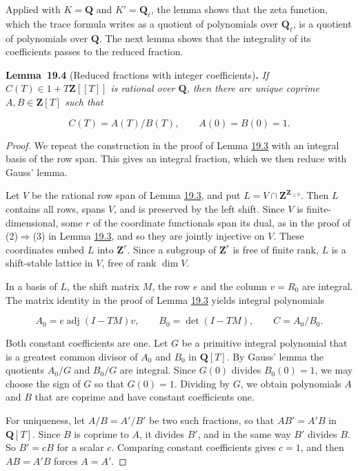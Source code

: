 \documentclass[11pt]{article}
\newenvironment{bpstatement}[2]{\par\addvspace{0.6\baselineskip}\noindent\textbf{#1}#2\textbf{.}\enspace\ignorespaces}
  {\par\addvspace{0.4\baselineskip}}
\newenvironment{bpstatementit}[2]{\begin{bpstatement}{#1}{#2}\itshape\ignorespaces}{\end{bpstatement}}
\begin{document}
\label{bp332}%
Applied with \(K=\mathbf Q\) and \(K'=\mathbf Q_\ell\), the lemma shows that the zeta function, which the trace formula writes as a quotient of polynomials over \(\mathbf Q_\ell\), is a quotient of polynomials over \(\mathbf Q\). The next lemma shows that the integrality of its coefficients passes to the reduced fraction.

\label{bp333}%
\begin{bpstatementit}{Lemma~19.4}{ (Reduced fractions with integer coefficients)}
If \(C(T)\in1+T\mathbf Z[[T]]\) is rational over \(\mathbf Q\), then there are unique coprime \(A,B\in\mathbf Z[T]\) such that

\[
C(T)=A(T)/B(T),\qquad A(0)=B(0)=1.
\]
\end{bpstatementit}

\begin{proof}[{Proof}]\label{bp334}%
We repeat the construction in the proof of Lemma \hyperref[bp330]{19.3} with an integral basis of the row span. This gives an integral fraction, which we then reduce with Gauss' lemma.

Let \(V\) be the rational row span of Lemma \hyperref[bp330]{19.3}, and put \(L=V\cap\mathbf Z^{\mathbf Z_{\geq0}}\). Then \(L\) contains all rows, spans \(V\), and is preserved by the left shift. Since \(V\) is finite-dimensional, some \(r\) of the coordinate functionals span its dual, as in the proof of (2)\(\Rightarrow\)(3) in Lemma \hyperref[bp330]{19.3}, and so they are jointly injective on \(V\). These coordinates embed \(L\) into \(\mathbf Z^r\). Since a subgroup of \(\mathbf Z^r\) is free of finite rank, \(L\) is a shift-stable lattice in \(V\), free of rank \(\dim V\).

In a basis of \(L\), the shift matrix \(M\), the row \(e\) and the column \(v=R_0\) are integral. The matrix identity in the proof of Lemma \hyperref[bp330]{19.3} yields integral polynomials

\[
A_0=e\operatorname{adj}(I-TM)v,\qquad B_0=\det(I-TM),
\qquad C=A_0/B_0.
\]

Both constant coefficients are one. Let \(G\) be a primitive integral polynomial that is a greatest common divisor of \(A_0\) and \(B_0\) in \(\mathbf Q[T]\). By Gauss' lemma the quotients \(A_0/G\) and \(B_0/G\) are integral. Since \(G(0)\) divides \(B_0(0)=1\), we may choose the sign of \(G\) so that \(G(0)=1\). Dividing by \(G\), we obtain polynomials \(A\) and \(B\) that are coprime and have constant coefficients one.

For uniqueness, let \(A/B=A'/B'\) be two such fractions, so that \(AB'=A'B\) in \(\mathbf Q[T]\). Since \(B\) is coprime to \(A\), it divides \(B'\), and in the same way \(B'\) divides \(B\). So \(B'=cB\) for a scalar \(c\). Comparing constant coefficients gives \(c=1\), and then \(AB=A'B\) forces \(A=A'\).
\end{proof}
\end{document}
